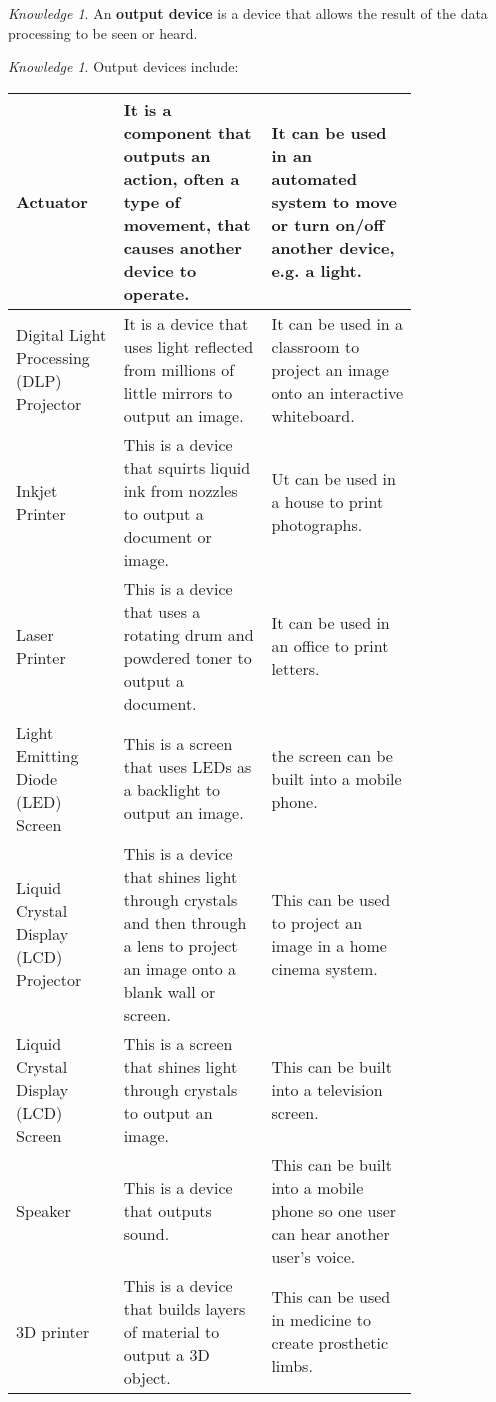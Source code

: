 \documentclass[8pt]{article}
\theoremstyle{remark}
\newtheorem{knowledge}[method]{Knowledge}
\begin{document}
            \begin{knowledge}
                An \textbf{output device} is a device that allows the result of the data processing to be seen or heard.
            \end{knowledge}

            \begin{knowledge}
                Output devices include:
                \begin{center}
                    \begin{tabular}{p{0.2\linewidth}|p{0.3\linewidth}|p{0.3\linewidth}}
                        Actuator & It is a component that outputs an action, often a type of movement, that causes another device to operate. & It can be used in an automated system to move or turn on/off another device, e.g. a light.\\\hline
                        Digital Light Processing (DLP) Projector & It is a device that uses light reflected from millions of little mirrors to output an image. & It can be used in a classroom to project an image onto an interactive whiteboard.\\\hline
                        Inkjet Printer & This is a device that squirts liquid ink from nozzles to output a document or image. & Ut can be used in a house to print photographs.\\\hline
                        Laser Printer & This is a device that uses a rotating drum and powdered toner to output a document. & It can be used in an office to print letters.\\\hline
                        Light Emitting Diode (LED) Screen & This is a screen that uses LEDs as a backlight to output an image. & the screen can be built into a mobile phone.\\\hline
                        Liquid Crystal Display (LCD) Projector & This is a device that shines light through crystals and then through a lens to project an image onto a blank wall or screen. & This can be used to project an image in a home cinema system.\\\hline
                        Liquid Crystal Display (LCD) Screen & This is a screen that shines light through crystals to output an image. & This can be built into a television screen.\\\hline
                        Speaker & This is a device that outputs sound. & This can be built into a mobile phone so one user can hear another user's voice.\\\hline
                        3D printer & This is a device that builds layers of material to output a 3D object. & This can be used in medicine to create prosthetic limbs.
                    \end{tabular}
                \end{center}
            \end{knowledge}
\end{document}
